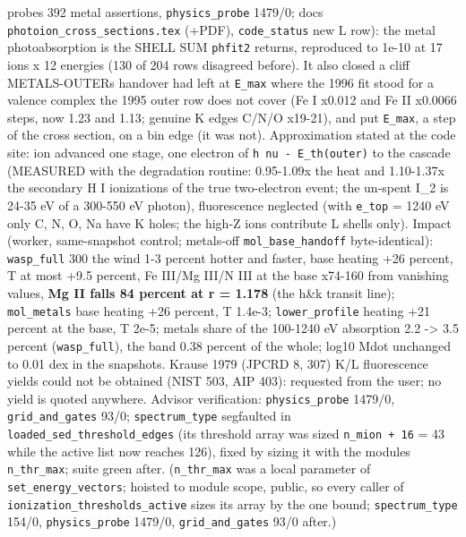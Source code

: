 \documentclass[english,a4paper]{my_memo}
\begin{document}
\begin{itemize}
  probes 392 metal assertions, \texttt{physics\_probe} 1479/0; docs
  \texttt{photoion\_cross\_sections.tex} (+PDF), \texttt{code\_status} new L row): the metal
  photoabsorption is the SHELL SUM \texttt{phfit2} returns, reproduced to 1e-10 at
  17 ions x 12 energies (130 of 204 rows disagreed before). It also closed a
  cliff METALS-OUTER\textquotesingle s handover had left at \texttt{E\_max} where the 1996 fit stood
  for a valence complex the 1995 outer row does not cover (Fe I x0.012 and
  Fe II x0.0066 steps, now 1.23 and 1.13; genuine K edges C/N/O x19-21), and
  put \texttt{E\_max}, a step of the cross section, on a bin edge (it was not).
  Approximation stated at the code site: ion advanced one stage, one
  electron of \texttt{h\ nu\ -\ E\_th(outer)} to the cascade (MEASURED with the
  degradation routine: 0.95-1.09x the heat and 1.10-1.37x the secondary H I
  ionizations of the true two-electron event; the un-spent I\_2 is 24-35 eV
  of a 300-550 eV photon), fluorescence neglected (with \texttt{e\_top} = 1240 eV
  only C, N, O, Na have K holes; the high-Z ions contribute L shells only).
  Impact (worker, same-snapshot control; metals-off \texttt{mol\_base\_handoff}
  byte-identical): \texttt{wasp\_full} 300 the wind 1-3 percent hotter and faster,
  base heating +26 percent, T at most +9.5 percent, Fe III/Mg III/N III at
  the base x74-160 from vanishing values, \textbf{Mg II falls 84 percent at r =
  1.178} (the h\&k transit line); \texttt{mol\_metals} base heating +26 percent, T
  1.4e-3; \texttt{lower\_profile} heating +21 percent at the base, T 2e-5; metals\textquotesingle{}
  share of the 100-1240 eV absorption 2.2 -\textgreater{} 3.5 percent (\texttt{wasp\_full}), the
  band 0.38 percent of the whole; log10 Mdot unchanged to 0.01 dex in the
  snapshots. Krause 1979 (JPCRD 8, 307) K/L fluorescence yields could not
  be obtained (NIST 503, AIP 403): requested from the user; no yield is
  quoted anywhere.
  Advisor verification: \texttt{physics\_probe} 1479/0, \texttt{grid\_and\_gates} 93/0;
  \texttt{spectrum\_type} segfaulted in \texttt{loaded\_sed\_threshold\_edges} (its threshold
  array was sized \texttt{n\_mion\ +\ 16} = 43 while the active list now reaches 126),
  fixed by sizing it with the module\textquotesingle s \texttt{n\_thr\_max}; suite green after.
  (\texttt{n\_thr\_max} was a local parameter of \texttt{set\_energy\_vectors}; hoisted to
  module scope, public, so every caller of \texttt{ionization\_thresholds\_active}
  sizes its array by the one bound; \texttt{spectrum\_type} 154/0, \texttt{physics\_probe}
  1479/0, \texttt{grid\_and\_gates} 93/0 after.)

\end{itemize}
\end{document}
